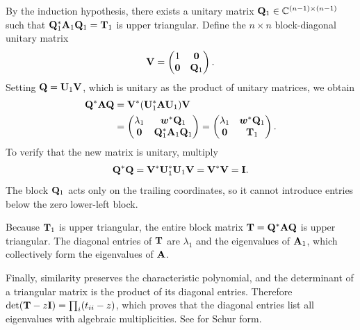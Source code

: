 \documentclass[../main.tex]{subfiles}
\begin{document}
{By the induction hypothesis, there exists a unitary matrix $\mathbf{Q}_1 \in \mathbb{C}^{(n-1) \times (n-1)}$ such that $\mathbf{Q}_1^* \mathbf{A}_1 \mathbf{Q}_1 = \mathbf{T}_1$ is upper triangular. Define the $n \times n$ block-diagonal unitary matrix
\begin{align*}
    \mathbf{V} = \begin{pmatrix} 1 & \mathbf{0} \\ \mathbf{0} & \mathbf{Q}_1 \end{pmatrix}.
\end{align*}
Setting $\mathbf{Q} = \mathbf{U}_1 \mathbf{V}$, which is unitary as the product of unitary matrices, we obtain
\begin{align*}
    \mathbf{Q}^*\mathbf{A}\mathbf{Q}
    &=\mathbf{V}^*(\mathbf{U}_1^*\mathbf{A}\mathbf{U}_1)\mathbf{V}\\
    &=\begin{pmatrix}\lambda_1&\boldsymbol{w}^*\mathbf{Q}_1\\\mathbf{0}&\mathbf{Q}_1^*\mathbf{A}_1\mathbf{Q}_1\end{pmatrix}
      =\begin{pmatrix}\lambda_1&\boldsymbol{w}^*\mathbf{Q}_1\\\mathbf{0}&\mathbf{T}_1\end{pmatrix}.
\end{align*}
To verify that the new matrix is unitary, multiply
\begin{align*}
 \mathbf{Q}^*\mathbf{Q}=\mathbf{V}^*\mathbf{U}_1^*\mathbf{U}_1\mathbf{V}=\mathbf{V}^*\mathbf{V}=\mathbf{I}.
\end{align*}
The block $\mathbf{Q}_1$ acts only on the trailing coordinates, so it cannot introduce entries below the zero lower-left block.

Because $\mathbf{T}_1$ is upper triangular, the entire block matrix $\mathbf{T} = \mathbf{Q}^*\mathbf{A}\mathbf{Q}$ is upper triangular. The diagonal entries of $\mathbf{T}$ are $\lambda_1$ and the eigenvalues of $\mathbf{A}_1$, which collectively form the eigenvalues of $\mathbf{A}$.


Finally, similarity preserves the characteristic polynomial, and the determinant of a triangular matrix is the product of its diagonal entries. Therefore $\det(\mathbf{T}-z\mathbf{I})=\prod_i(t_{ii}-z)$, which proves that the diagonal entries list all eigenvalues with algebraic multiplicities. See \citet{hornjohnson2012} for Schur form.
}

\label{thm:spectral-symmetric}
\end{document}
